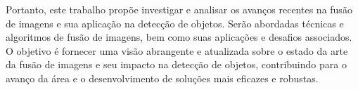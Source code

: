 Portanto, este trabalho propõe investigar e analisar os avanços recentes na fusão de imagens e sua aplicação na detecção de objetos. Serão abordadas técnicas e algoritmos de fusão de imagens, bem como suas aplicações e desafios associados. O objetivo é fornecer uma visão abrangente e atualizada sobre o estado da arte da fusão de imagens e seu impacto na detecção de objetos, contribuindo para o avanço da área e o desenvolvimento de soluções mais eficazes e robustas.





